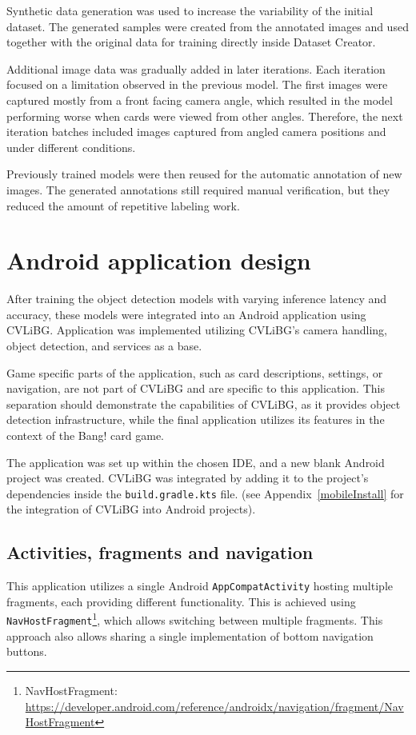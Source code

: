 Synthetic data generation was used to increase the variability of the initial dataset. The generated samples were created from the annotated images and used together with the original data for training directly inside Dataset Creator. 

Additional image data was gradually added in later iterations. Each iteration focused on a limitation observed in the previous model. The first images were captured mostly from a front facing camera angle, which resulted in the model performing worse when cards were viewed  from other angles. Therefore, the next iteration batches included images captured from angled camera positions and under different conditions. 

Previously trained models were then reused for the automatic annotation of new images. The generated annotations still required manual verification, but they reduced the amount of repetitive labeling work.




\section{Android application design}
After training the object detection models with varying inference latency and accuracy, these models were integrated into an Android application using CVLiBG. Application was implemented utilizing CVLiBG's camera handling, object detection, and services as a base.

Game specific parts of the application, such as card descriptions, settings, or navigation, are not part of CVLiBG and are specific to this application. This separation should demonstrate the capabilities of CVLiBG, as it provides object detection infrastructure, while the final application utilizes its features in the context of the Bang! card game.

The application was set up within the chosen IDE, and a new blank Android project was created. CVLiBG was integrated by adding it to the project's dependencies inside the \texttt{build.gradle.kts} file. (see Appendix~\ref{mobileInstall} for the integration of CVLiBG into Android projects).


\subsection{Activities, fragments and navigation}
This application utilizes a single Android \texttt{AppCompatActivity} hosting multiple fragments, each providing different functionality. This is achieved using \texttt{NavHostFragment}\footnote{NavHostFragment: \url{https://developer.android.com/reference/androidx/navigation/fragment/NavHostFragment}}, which allows switching between multiple fragments. This approach also allows sharing a single implementation of bottom navigation buttons.

